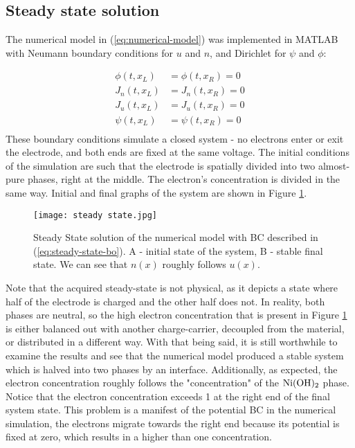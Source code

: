 \documentclass[12pt]{article}
\begin{document}
\pagebreak
\subsection{Steady state solution}
The numerical model in (\ref{eq:numerical-model}) was implemented in MATLAB with Neumann boundary conditions for $u$ and $n$, and Dirichlet for $\psi$ and $\phi$:

\begin{equation}\label{eq:steady-state-bo}
    \begin{aligned}
        \phi(t, x_L) &= \phi(t, x_R) = 0 \\
        J_n(t, x_L) &= J_n(t, x_R) = 0 \\ 
        J_u(t, x_L) &= J_u(t, x_R) = 0 \\
        \psi(t, x_L) &= \psi(t, x_R) = 0 \\
    \end{aligned}
\end{equation}
These boundary conditions simulate a closed system - no electrons enter or exit the electrode, and both ends are fixed at the same voltage. The initial conditions of the simulation are such that the electrode is spatially divided into two almost-pure phases, right at the middle. The electron's concentration is divided in the same way. Initial and final graphs of the system are shown in Figure \ref{fig:steady-state}.

\begin{figure}[h!] 
	\centering 
	\texttt{[image: steady state.jpg]}
	\caption{Steady State solution of the numerical model with BC described in (\ref{eq:steady-state-bo}). A - initial state of the system, B - stable final state. We can see that $n(x)$ roughly follows $u(x)$.  } \label{fig:steady-state}
\end{figure}

Note that the acquired steady-state is not physical, as it depicts a state where half of the electrode is charged and the other half does not. In reality, both phases are neutral, so the high electron concentration that is present in Figure \ref{fig:steady-state} is either balanced out with another charge-carrier, decoupled from the material, or distributed in a different way.
With that being said, it is still worthwhile to examine the results and see that the numerical model produced a stable system which is halved into two phases by an interface. Additionally, as expected, the electron concentration roughly follows the "concentration" of the $\ce{Ni(OH)_2}$ phase. 
Notice that the electron concentration exceeds 1 at the right end of the final system state. This problem is a manifest of the potential BC in the numerical simulation, the electrons migrate towards the right end because its potential is fixed at zero, which results in a higher than one concentration.
\end{document}
